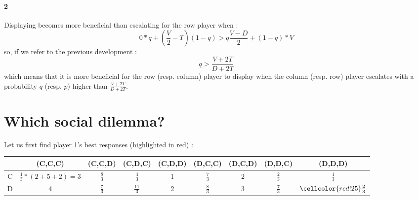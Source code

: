 \documentclass[a4paper]{article}
\begin{document}
\paragraph{2} Displaying becomes more beneficial than escalating for the
row player when : 
$$ 0*q + (\frac{V}{2} - T) (1-q) > q\frac{V-D}{2} + (1-q)*V$$
so, if we refer to the previous development : 
$$ q >  \frac{V+2T}{D+2T} $$ 
which means that it is more beneficial for the row (resp. column) player to 
display when the column (resp. row) player escalates with a probability $q$
(resp. $p$) higher than $\frac{V+2T}{D+2T}$. 


\section{Which social dilemma?}
Let us first find player 1's best responses (highlighted in red) :\\ 
\begin{table}[H]
\begin{tabular}{c|c|c|c|c|c|c|c|c}
	& (C,C,C) & (C,C,D) & (C,D,C) & (C,D,D)
	& (D,C,C) & (D,C,D) & (D,D,C) & (D,D,D)\\
	\hline
	C & $\frac{1}{3} * (2 + 5 + 2 ) = 3 $ &
		\cellcolor{red!25} $\frac{8}{3}$ &$\frac{4}{3}$ & 1 &
		$\frac{7}{3}$ & 2 & $\frac{2}{3}$ &
		$\frac{1}{3}$ \\
	\hline
	D & \cellcolor{red!25} 4 & $\frac{7}{3}$ & 
		\cellcolor{red!25} $\frac{11}{3}$ & \cellcolor{red!25} 2
		& \cellcolor{red!25} $\frac{8}{3}$ & \cellcolor{red!25} 3 
		& \cellcolor{red!25} $\frac{7}{3}$ & 
		$\cellcolor{red!25} \frac{2}{3}$ \\
\end{tabular}
\end{table}
\end{document}
